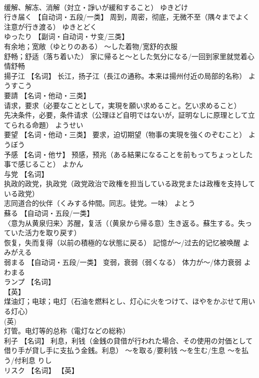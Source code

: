 \documentclass[8pt]{extreport}
\begin{document}
\begin{CJK}{UTF8}{min}
\\	缓解、解冻、消解（対立・諍いが緩和すること）	ゆきどけ	
\\	行き届く	【自动词・五段/一类】 周到，周密，彻底，无微不至（隅々までよく注意が行き渡る）	ゆきとどく	
\\	ゆったり	【副词・自动词・サ变/三类】 
\\	有余地；宽敞（ゆとりのある） ～した着物/宽舒的衣服 
\\	舒畅；舒适（落ち着いた） 家に帰ると～とした気分になる/一回到家里就觉着心情舒畅		
\\	揚子江	【名词】 长江，扬子江（長江の通称。本来は揚州付近の局部的名称）	ようすこう	
\\	要請	【名词・他动・三类】 
\\	请求，要求（必要なこととして，実現を願い求めること。乞い求めること） 
\\	先决条件，必要，条件请求（公理ほど自明ではないが，証明なしに原理として立てられる命題）	ようせい	
\\	要望	【名词・他动・三类】 要求，迫切期望（物事の実現を強くのぞむこと）	ようぼう	
\\	予感	【名词・他サ】 预感，预兆（ある結果になることを前もってちょっとした事で感じること）	よかん	
\\	与党	【名词】 
\\	执政的政党，执政党（政党政治で政権を担当している政党または政権を支持している政党） 
\\	志同道合的伙伴（くみする仲間。同志。徒党。一味）	よとう	
\\	蘇る	【自动词・五段/一类】 
\\	〈意为从黄泉归来〉苏醒，复活（（黄泉から帰る意）生き返る。蘇生する。失っていた活力を取り戻す） 
\\	恢复，失而复得（以前の積極的な状態に戻る） 記憶が～/过去的记忆被唤醒	よみがえる	
\\	弱まる	【自动词・五段/一类】 变弱，衰弱（弱くなる） 体力が～/体力衰弱	よわまる	
\\	ランプ	【名词】 
\\	【英】
\\	煤油灯；电球；电灯（石油を燃料とし、灯心に火をつけて、ほやをかぶせて用いる灯心） 
\\	(英) 
\\	灯管。电灯等的总称（電灯などの総称）		
\\	利子	【名词】 利息，利钱（金銭の貸借が行われた場合、その使用の対価として借り手が貸し手に支払う金銭。利息） ～を取る/要利钱 ～を生む/生息 ～を払う/付利息	りし	
\\	リスク	【名词】 【英】

\end{CJK}
\end{document}
